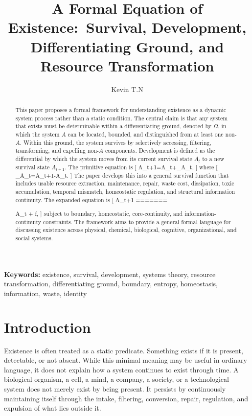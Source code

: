 \documentclass[11pt,a4paper]{article}
\title{\textbf{A Formal Equation of Existence:}\
Survival, Development, Differentiating Ground, and Resource Transformation}
\author{Kevin T.N}
\date{}
\begin{document}
\maketitle

\begin{abstract}
This paper proposes a formal framework for understanding existence as a dynamic system process rather than a static condition. The central claim is that any system that exists must be determinable within a differentiating ground, denoted by $\Omega$, in which the system $A$ can be located, bounded, and distinguished from at least one non-$A$. Within this ground, the system survives by selectively accessing, filtering, transforming, and expelling non-$A$ components. Development is defined as the differential by which the system moves from its current survival state $A_t$ to a new survival state $A_{t+1}$. The primitive equation is
[
A_{t+1}=A_t+\Delta_{\Omega}A_t,
]
where
[
\Delta_{\Omega}A_t=A_{t+1}-A_t.
]
The paper develops this into a general survival function that includes usable resource extraction, maintenance, repair, waste cost, dissipation, toxic accumulation, temporal mismatch, homeostatic regulation, and structural information continuity. The expanded equation is
[
A_{t+1}
=======

A_t
+
f,
]
subject to boundary, homeostatic, core-continuity, and information-continuity constraints. The framework aims to provide a general formal language for discussing existence across physical, chemical, biological, cognitive, organizational, and social systems.
\end{abstract}

\textbf{Keywords:} existence, survival, development, systems theory, resource transformation, differentiating ground, boundary, entropy, homeostasis, information, waste, identity

\section{Introduction}

Existence is often treated as a static predicate. Something exists if it is present, detectable, or not absent. While this minimal meaning may be useful in ordinary language, it does not explain how a system continues to exist through time. A biological organism, a cell, a mind, a company, a society, or a technological system does not merely exist by being present. It persists by continuously maintaining itself through the intake, filtering, conversion, repair, regulation, and expulsion of what lies outside it.
\end{document}
